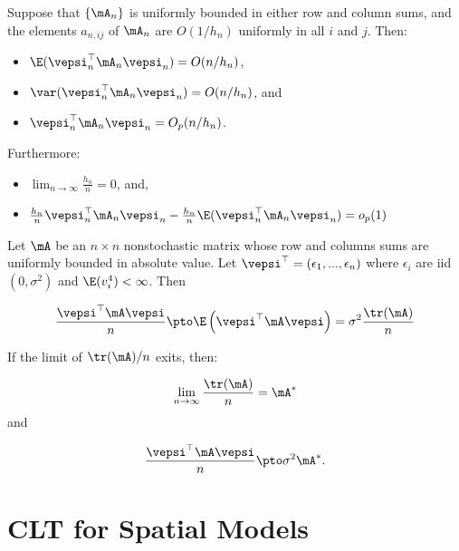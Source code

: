 \documentclass[english,12pt]{book}\usepackage[]{graphicx}\usepackage[]{xcolor}
\begin{document}
\begin{lemma}\label{lemma:O-lemma-lee}
Suppose that  $\left\lbrace \mA_n\right\rbrace$ is uniformly bounded in either row and column sums, and the elements $a_{n, ij}$ of $\mA_n$ are $O(1/h_n)$ uniformly in all $i$ and $j$. Then:

\begin{itemize}
  \item $\E(\vepsi_n^\top\mA_n\vepsi_n) = O(n/h_n)$,
  \item $\var(\vepsi_n^\top\mA_n\vepsi_n)=O(n/h_n)$, and
  \item $\vepsi_n^\top\mA_n\vepsi_n = O_p(n/h_n)$.
\end{itemize}

Furthermore:

\begin{itemize}
\item $\lim_{n\to\infty}\frac{h_n}{n} = 0$, and,
\item $\frac{h_n}{n}\vepsi_n^\top\mA_n\vepsi_n - \frac{h_n}{n}\E(\vepsi_n^\top\mA_n\vepsi_n) = o_p(1)$
\end{itemize}
\end{lemma}


\begin{theorem}\label{teo:quadratic-forms-ley}
Let $\mA$ be an $n\times n$ nonstochastic matrix whose row and columns sums are uniformly bounded in absolute value. Let $\vepsi^{\top}=(\epsilon_1, ..., \epsilon_n)$ where $\epsilon_i$ are iid $(0, \sigma^2)$ and $\E(v_i^4)<\infty$. Then

\begin{equation*}
  \frac{\vepsi^\top \mA \vepsi}{n}\pto \E\left(\vepsi^\top \mA \vepsi\right) = \sigma^2\frac{\tr(\mA)}{n}
\end{equation*}

If the limit of $\tr(\mA)/n$ exits, then:

\begin{equation*}
\lim_{n\to\infty}\frac{\tr(\mA)}{n} = \mA^*
\end{equation*}
%
and

\begin{equation*}
  \frac{\vepsi^\top \mA \vepsi}{n}\pto \sigma^2\mA^*.
\end{equation*}
\end{theorem}




\section{CLT for Spatial Models}
\end{document}
